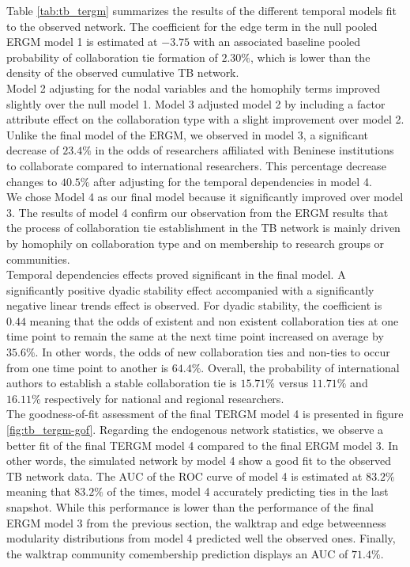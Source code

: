 Table \ref{tab:tb_tergm} summarizes the results of the different temporal models fit to the observed network. The coefficient for the edge term in the null pooled ERGM model 1 is estimated at $-3.75$ with an associated baseline pooled probability of collaboration tie formation of $2.30\%$, which is lower than the density of the observed cumulative TB network.\\
Model 2 adjusting for the nodal variables and the homophily terms improved slightly over the null model 1. Model 3 adjusted model 2 by including a factor attribute effect on the collaboration type with a slight improvement over model 2. Unlike the final model of the ERGM, we observed in model 3, a significant decrease of $23.4\%$ in the odds of researchers affiliated with Beninese institutions to collaborate compared to international researchers. This percentage decrease changes to $40.5\%$ after adjusting for the temporal dependencies in model 4. \\
We chose Model 4 as our final model because it significantly improved over model 3. The results of model 4 confirm our observation from the ERGM results that the process of collaboration tie establishment in the TB network is mainly driven by homophily on collaboration type and on membership to research groups or communities. \\
Temporal dependencies effects proved significant in the final model. A significantly positive dyadic stability effect accompanied with a significantly negative linear trends effect is observed. For dyadic stability, the coefficient is $0.44$ meaning that the odds of existent and non existent collaboration ties at one time point to remain the same at the next time point increased on average by $35.6\%$. In other words, the odds of new collaboration ties and non-ties to occur from one time point to another is $64.4\%$. Overall, the probability of international authors to establish a stable collaboration tie is $15.71\%$ versus $11.71\%$ and $16.11\%$ respectively for national and regional researchers.\\
The goodness-of-fit assessment of the final TERGM model 4 is presented in figure \ref{fig:tb_tergm-gof}. Regarding the endogenous network statistics, we observe a better fit of the final TERGM model 4 compared to the final ERGM model 3. In other words, the simulated network by model 4 show a good fit to the observed TB network data. The AUC of the ROC curve of model 4 is estimated at $83.2\%$ meaning that $83.2\%$ of the times, model 4 accurately predicting ties in the last snapshot. While this performance is lower than the performance of the final ERGM model 3 from the previous section, the walktrap and edge betweenness modularity distributions from model 4 predicted well the observed ones. Finally, the walktrap community comembership prediction displays an AUC of $71.4\%$.

